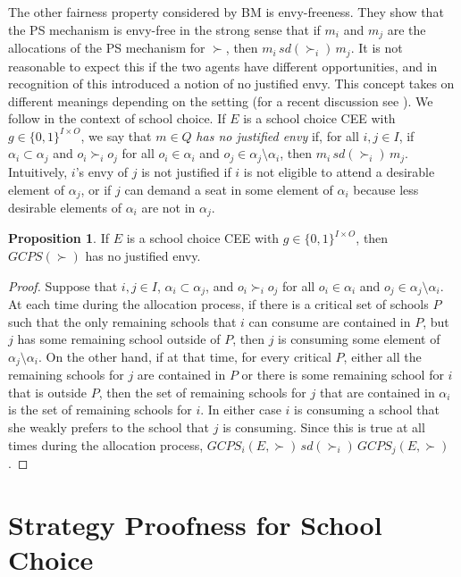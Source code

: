 \documentclass[12pt, A4paper]{article}
\theoremstyle{definition}
\newtheorem{prop}{Proposition}
\begin{document}
The other fairness property considered by BM is envy-freeness.  They show that the PS mechanism is envy-free in the strong sense that if $m_i$ and $m_j$ are the allocations of the PS mechanism for $\succ$, then $m_i \, sd(\succ_i) \, m_j$.  It is not reasonable to expect this if the two agents have different opportunities, and in recognition of this \cite{as03aer} introduced a notion of no justified envy.  This concept takes on different meanings depending on the setting (for a recent discussion see \cite{RoRoSh20}).  We follow \cite{yilmaz10geb} in the context of school choice.  If $E$ is a school choice CEE with $g \in \{0,1\}^{I \times O}$, we say that $m \in Q$ \emph{has no justified envy} if, for all $i,j \in I$, if $\alpha_i \subset \alpha_j$ and $o_i \succ_i o_j$ for all $o_i \in \alpha_i$ and $o_j \in \alpha_j \setminus \alpha_i$, then $m_i \, sd(\succ_i) \, m_j$.  Intuitively, $i$'s envy of $j$ is not justified if $i$ is not eligible to attend a desirable element of $\alpha_j$, or if $j$ can demand a seat in some element of $\alpha_i$ because less desirable elements of $\alpha_i$ are not in $\alpha_j$.

\begin{prop} \label{prop:jenvy}
  If $E$ is a school choice CEE with $g \in \{0,1\}^{I \times O}$, then $GCPS(\succ)$ has no justified envy.
\end{prop}

\begin{proof} %
  Suppose that $i,j \in I$, $\alpha_i \subset \alpha_j$, and $o_i \succ_i o_j$ for all $o_i \in \alpha_i$ and $o_j \in \alpha_j \setminus \alpha_i$.
  At each time during the allocation process, if there is a critical set of schools $P$ such that the only remaining schools that $i$ can consume are contained in $P$, but $j$ has some remaining school outside of $P$, then $j$ is consuming some element of $\alpha_j \setminus \alpha_i$.  On the other hand, if at that time, for every critical $P$, either all the remaining schools for $j$ are contained in $P$ or there is some remaining school for $i$ that is outside $P$, then the set of remaining schools for $j$ that are contained in $\alpha_i$ is the set of remaining schools for $i$.  In either case $i$ is consuming a school that she weakly prefers to the school that $j$ is consuming.  Since this is true at all times during the allocation process, $GCPS_i(E,\succ) \, sd(\succ_i) \, GCPS_j(E,\succ)$.
\end{proof}


\section{Strategy Proofness for School Choice} \label{sec:StrategyProof}
\end{document}
